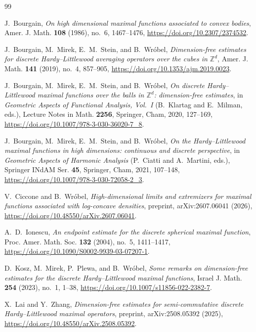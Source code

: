 \documentclass{article}
\theoremstyle{plain}
\numberwithin{equation}{section}
\begin{document}
\begin{thebibliography}{99}

J.~Bourgain,
\emph{On high dimensional maximal functions associated to convex bodies},
Amer. J. Math. \textbf{108} (1986), no.~6, 1467--1476,
\url{https://doi.org/10.2307/2374532}.

J.~Bourgain, M.~Mirek, E.~M.~Stein, and B.~Wr\'obel,
\emph{Dimension-free estimates for discrete Hardy--Littlewood averaging
operators over the cubes in $\mathbb Z^d$},
Amer. J. Math. \textbf{141} (2019), no.~4, 857--905,
\url{https://doi.org/10.1353/ajm.2019.0023}.

J.~Bourgain, M.~Mirek, E.~M.~Stein, and B.~Wr\'obel,
\emph{On discrete Hardy--Littlewood maximal functions over the balls in
$\mathbb Z^d$: dimension-free estimates},
in \emph{Geometric Aspects of Functional Analysis, Vol.~I}
(B.~Klartag and E.~Milman, eds.),
Lecture Notes in Math. \textbf{2256},
Springer, Cham, 2020, 127--169,
\url{https://doi.org/10.1007/978-3-030-36020-7_8}.

J.~Bourgain, M.~Mirek, E.~M.~Stein, and B.~Wr\'obel,
\emph{On the Hardy--Littlewood maximal functions in high dimensions:
continuous and discrete perspective},
in \emph{Geometric Aspects of Harmonic Analysis}
(P.~Ciatti and A.~Martini, eds.),
Springer INdAM Ser. \textbf{45},
Springer, Cham, 2021, 107--148,
\url{https://doi.org/10.1007/978-3-030-72058-2_3}.

V.~Ciccone and B.~Wr\'obel,
\emph{High-dimensional limits and extremizers for maximal functions
associated with log-concave densities},
preprint, arXiv:2607.06041 (2026),
\url{https://doi.org/10.48550/arXiv.2607.06041}.

A.~D.~Ionescu,
\emph{An endpoint estimate for the discrete spherical maximal function},
Proc. Amer. Math. Soc. \textbf{132} (2004), no.~5, 1411--1417,
\url{https://doi.org/10.1090/S0002-9939-03-07207-1}.

D.~Kosz, M.~Mirek, P.~Plewa, and B.~Wr\'obel,
\emph{Some remarks on dimension-free estimates for the discrete
Hardy--Littlewood maximal functions},
Israel J. Math. \textbf{254} (2023), no.~1, 1--38,
\url{https://doi.org/10.1007/s11856-022-2382-7}.

X.~Lai and Y.~Zhang,
\emph{Dimension-free estimates for semi-commutative discrete
Hardy--Littlewood maximal operators},
preprint, arXiv:2508.05392 (2025),
\url{https://doi.org/10.48550/arXiv.2508.05392}.


\end{thebibliography}
\end{document}
